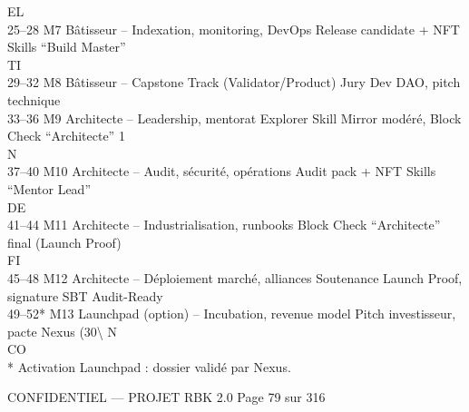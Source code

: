 \documentclass[12pt,landscape,a4paper]{article}
\newenvironment{confidential}
{\begin{tcolorbox}[
    colback=rbkred!5!white,
    colframe=rbkred!75!black,
    title=CONFIDENTIEL,
    fonttitle=\bfseries\color{white},
    coltitle=rbkred!75!black,
    breakable,
    enhanced,
    frame hidden,
    borderline west={2pt}{0pt}{rbkred!75!black}
]}
{\end{tcolorbox}}
\begin{document}
\vspace{0.5em}
\vspace{0.5em}
\vspace{0.5em}
EL\\
25–28       M7       Bâtisseur – Indexation, monitoring, DevOps           Release candidate + NFT Skills “Build Master”\\
\vspace{0.5em}
\vspace{0.5em}
\vspace{0.5em}
\vspace{0.5em}
TI\\
29–32       M8       Bâtisseur – Capstone Track (Validator/Product)       Jury Dev DAO, pitch technique\\
33–36       M9       Architecte – Leadership, mentorat Explorer           Skill Mirror modéré, Block Check “Architecte” 1\\
\vspace{0.5em}
\vspace{0.5em}
\vspace{0.5em}
\vspace{0.5em}
N\\
37–40       M10      Architecte – Audit, sécurité, opérations             Audit pack + NFT Skills “Mentor Lead”\\
\vspace{0.5em}
\vspace{0.5em}
\vspace{0.5em}
\vspace{0.5em}
DE\\
41–44       M11      Architecte – Industrialisation, runbooks             Block Check “Architecte” final (Launch Proof)\\
\vspace{0.5em}
\vspace{0.5em}
\vspace{0.5em}
\vspace{0.5em}
FI\\
45–48       M12      Architecte – Déploiement marché, alliances           Soutenance Launch Proof, signature SBT Audit-Ready\\
49–52*      M13      Launchpad (option) – Incubation, revenue model       Pitch investisseur, pacte Nexus (30\textbackslash{}%
\vspace{0.5em}
N\\
CO\\
* Activation Launchpad : dossier validé par Nexus.\\
\vspace{0.5em}
\vspace{0.5em}
\vspace{0.5em}
\vspace{0.5em}
\begin{confidential}CONFIDENTIEL — PROJET RBK 2.0                                   Page 79 sur 316\end{confidential}
\end{document}
